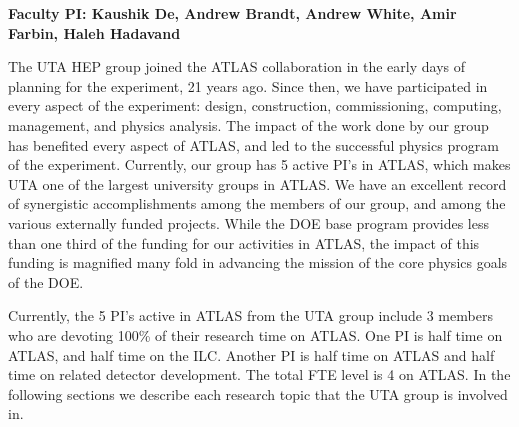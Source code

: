 
\textbf{Faculty PI: Kaushik De, Andrew Brandt, Andrew White, Amir Farbin, Haleh Hadavand}

The UTA HEP group joined the ATLAS collaboration in the early days of planning for the experiment, 21 years ago. Since then, we have participated in every aspect of the experiment: design, construction, commissioning, computing, management, and physics analysis. 
The impact of the work done by our group has benefited every aspect of ATLAS, and led to the successful physics program of the experiment. 
Currently, our group has 5 active PI's in ATLAS, which makes UTA one of the largest university groups in ATLAS. We have an excellent record of synergistic accomplishments 
among the members of our group, and among the various externally funded projects. While the DOE base program provides less than one third of the funding for our activities in ATLAS, the impact of 
this funding is magnified many fold in advancing the mission of the core physics goals of the DOE.

Currently, the 5 PI's active in ATLAS from the UTA group include 3 members who are devoting 100\% of their research time on ATLAS. One PI is half time on ATLAS, and half time on the ILC. Another PI is half time on ATLAS and half time on related detector development. The total FTE level is 4 on ATLAS. In the following sections we describe each research topic that the UTA group is involved in.